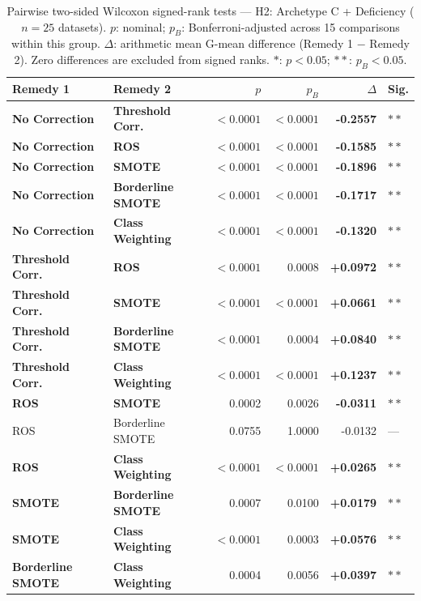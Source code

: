 \begin{table}[ht]
\centering
\scriptsize
\caption{Pairwise two-sided Wilcoxon signed-rank tests --- H2: Archetype C + Deficiency ($n=25$ datasets). $p$: nominal; $p_B$: Bonferroni-adjusted across 15 comparisons within this group. $\Delta$: arithmetic mean G-mean difference (Remedy 1 $-$ Remedy 2). Zero differences are excluded from signed ranks. $\ast$: $p<0.05$; $\ast\ast$: $p_B<0.05$.}
\label{tab:wilcoxon_h2}
\begin{tabular}{llrrrl}
\toprule
\textbf{Remedy 1} & \textbf{Remedy 2} & \textbf{$p$} & \textbf{$p_B$} & \textbf{$\Delta$} & \textbf{Sig.} \\
\midrule
    \textbf{No Correction} & \textbf{Threshold Corr.} & $<0.0001$ & $<0.0001$ & \textbf{-0.2557} & $\ast\ast$ \\
    \textbf{No Correction} & \textbf{ROS} & $<0.0001$ & $<0.0001$ & \textbf{-0.1585} & $\ast\ast$ \\
    \textbf{No Correction} & \textbf{SMOTE} & $<0.0001$ & $<0.0001$ & \textbf{-0.1896} & $\ast\ast$ \\
    \textbf{No Correction} & \textbf{Borderline SMOTE} & $<0.0001$ & $<0.0001$ & \textbf{-0.1717} & $\ast\ast$ \\
    \textbf{No Correction} & \textbf{Class Weighting} & $<0.0001$ & $<0.0001$ & \textbf{-0.1320} & $\ast\ast$ \\
    \textbf{Threshold Corr.} & \textbf{ROS} & $<0.0001$ & 0.0008 & \textbf{+0.0972} & $\ast\ast$ \\
    \textbf{Threshold Corr.} & \textbf{SMOTE} & $<0.0001$ & $<0.0001$ & \textbf{+0.0661} & $\ast\ast$ \\
    \textbf{Threshold Corr.} & \textbf{Borderline SMOTE} & $<0.0001$ & 0.0004 & \textbf{+0.0840} & $\ast\ast$ \\
    \textbf{Threshold Corr.} & \textbf{Class Weighting} & $<0.0001$ & $<0.0001$ & \textbf{+0.1237} & $\ast\ast$ \\
    \textbf{ROS} & \textbf{SMOTE} & 0.0002 & 0.0026 & \textbf{-0.0311} & $\ast\ast$ \\
    ROS & Borderline SMOTE & 0.0755 & 1.0000 & -0.0132 & --- \\
    \textbf{ROS} & \textbf{Class Weighting} & $<0.0001$ & $<0.0001$ & \textbf{+0.0265} & $\ast\ast$ \\
    \textbf{SMOTE} & \textbf{Borderline SMOTE} & 0.0007 & 0.0100 & \textbf{+0.0179} & $\ast\ast$ \\
    \textbf{SMOTE} & \textbf{Class Weighting} & $<0.0001$ & 0.0003 & \textbf{+0.0576} & $\ast\ast$ \\
    \textbf{Borderline SMOTE} & \textbf{Class Weighting} & 0.0004 & 0.0056 & \textbf{+0.0397} & $\ast\ast$ \\
\bottomrule
\end{tabular}
\end{table}
